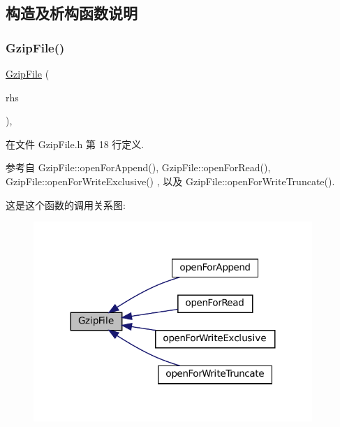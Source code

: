 \subsection{构造及析构函数说明}
\mbox{\label{classmuduo_1_1GzipFile_a4591ce59f7007cd95c859dc28622bdb4}} 
\subsubsection{\texorpdfstring{Gzip\+File()}{GzipFile()}\hspace{0.1cm}{\footnotesize\ttfamily [1/2]}}
{\footnotesize\ttfamily \hyperlink{classmuduo_1_1GzipFile}{Gzip\+File} (\begin{DoxyParamCaption}\item[{\hyperlink{classmuduo_1_1GzipFile}{Gzip\+File} \&\&}]{rhs }\end{DoxyParamCaption})\hspace{0.3cm}{\ttfamily [inline]}, {\ttfamily [noexcept]}}



在文件 Gzip\+File.\+h 第 18 行定义.



参考自 Gzip\+File\+::open\+For\+Append(), Gzip\+File\+::open\+For\+Read(), Gzip\+File\+::open\+For\+Write\+Exclusive() , 以及 Gzip\+File\+::open\+For\+Write\+Truncate().

这是这个函数的调用关系图\+:
\nopagebreak
\begin{figure}[H]
\begin{center}
\leavevmode
\includegraphics[width=299pt]{classmuduo_1_1GzipFile_a4591ce59f7007cd95c859dc28622bdb4_icgraph}
\end{center}
\end{figure}
\mbox{\label{classmuduo_1_1GzipFile_a7d63cf49097d53ffc7e8d945a6816a2a}} 
